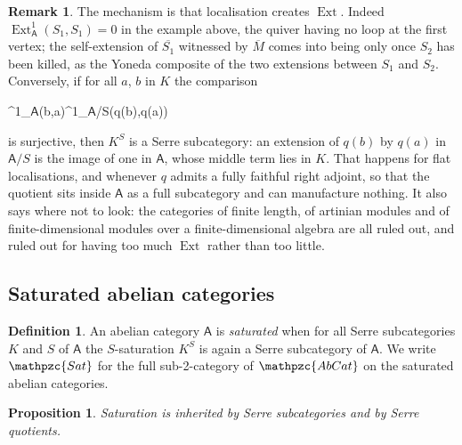 \documentclass[reqno,a4paper]{amsart}
\numberwithin{equation}{section}
\theoremstyle{plain}
\newtheorem{proposition}[subsection]{Proposition}
\theoremstyle{definition}
\newtheorem{definition}[subsection]{Definition}
\newtheorem{remark}[subsection]{Remark}
\def\dfn#1{{\itshape #1}}
\newenvironment{eqD*}{\begin{equation*}}{\end{equation*}\ignorespacesafterend}
\newcommand{\ov}[1]{\overline{#1}}
\newcommand{\catfont}[1]{\ensuremath{\mathpzc{#1}}\xspace}
\newcommand{\onecat}[1]{\ensuremath{\mathsf{#1}}\xspace}
\newcommand{\AbCat}{\catfont{AbCat}}
\newcommand{\Sat}{\catfont{Sat}}
\renewcommand{\1}{\onecat{1}}
\DeclareMathOperator{\Ext}{Ext}
\newcommand{\too}{\longrightarrow}
\begin{document}
\begin{remark}\label{Rem Ext}
	The mechanism is that localisation creates \(\Ext\). Indeed \(\Ext^{1}_{\onecat{A}}(S_{1},S_{1})=0\) in the example above, the quiver having no loop at the first vertex; the self-extension of \(\ov{S_{1}}\) witnessed by \(\ov{M}\) comes into being only once \(S_{2}\) has been killed, as the Yoneda composite of the two extensions between \(S_{1}\) and \(S_{2}\). Conversely, if for all \(a\), \(b\) in \(K\) the comparison
	\begin{eqD*}
		\Ext^{1}_{\onecat{A}}(b,a)\too\Ext^{1}_{\onecat{A}/S}(q(b),q(a))
	\end{eqD*}
	is surjective, then \(K^{S}\) is a Serre subcategory: an extension of \(q(b)\) by \(q(a)\) in \(\onecat{A}/S\) is the image of one in \(\onecat{A}\), whose middle term lies in \(K\). That happens for flat localisations, and whenever \(q\) admits a fully faithful right adjoint, so that the quotient sits inside \(\onecat{A}\) as a full subcategory and can manufacture nothing. It also says where not to look: the categories of finite length, of artinian modules and of finite-dimensional modules over a finite-dimensional algebra are all ruled out, and ruled out for having too much \(\Ext\) rather than too little.
\end{remark}

\subsection{Saturated abelian categories}\label{SS:ModelSAT}

\begin{definition}\label{D:SAT}
	An abelian category \(\onecat{A}\) is \dfn{saturated} when for all Serre subcategories \(K\) and \(S\) of \(\onecat{A}\) the \(S\)-saturation \(K^{S}\) is again a Serre subcategory of \(\onecat{A}\). We write \(\Sat\) for the full sub-2-category of \(\AbCat\) on the saturated abelian categories.
\end{definition}

\begin{proposition}\label{P:SATclosed}
	Saturation is inherited by Serre subcategories and by Serre quotients.
\end{proposition}
\end{document}
